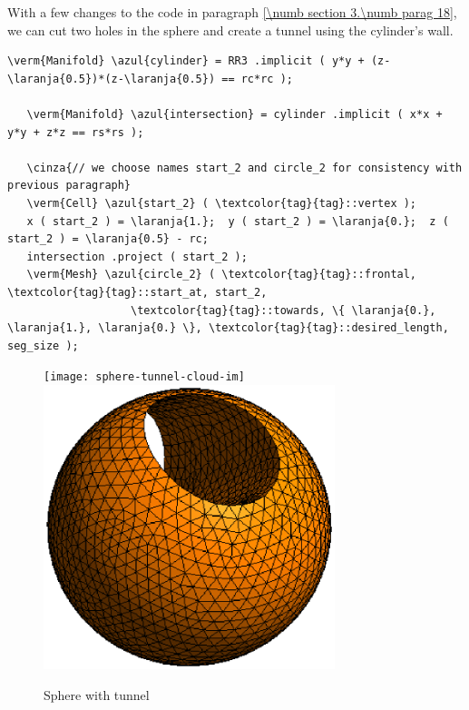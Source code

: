 With a few changes to the code in paragraph \ref{\numb section 3.\numb parag 18},
we can cut two holes in the sphere and create a tunnel using the cylinder's wall.
\medskip

\begin{Verbatim}[commandchars=\\\{\},formatcom=\small\tt,frame=single,
   label=parag-\ref{\numb section 3.\numb parag 19}.cpp,rulecolor=\color{moldura},
   baselinestretch=0.94,framesep=2mm                                              ]
   \verm{Manifold} \azul{cylinder} = RR3 .implicit ( y*y + (z-\laranja{0.5})*(z-\laranja{0.5}) == rc*rc );

   \verm{Manifold} \azul{intersection} = cylinder .implicit ( x*x + y*y + z*z == rs*rs );

   \cinza{// we choose names start_2 and circle_2 for consistency with previous paragraph}
   \verm{Cell} \azul{start_2} ( \textcolor{tag}{tag}::vertex );
   x ( start_2 ) = \laranja{1.};  y ( start_2 ) = \laranja{0.};  z ( start_2 ) = \laranja{0.5} - rc;
   intersection .project ( start_2 );
   \verm{Mesh} \azul{circle_2} ( \textcolor{tag}{tag}::frontal, \textcolor{tag}{tag}::start_at, start_2,
                   \textcolor{tag}{tag}::towards, \{ \laranja{0.}, \laranja{1.}, \laranja{0.} \}, \textcolor{tag}{tag}::desired_length, seg_size );
\end{Verbatim}

\begin{figure}[ht] \centering
\if{}
 \texttt{[image: sphere-tunnel-cloud-im]}
\else
 \includegraphics[width=85mm]{sphere-tunnel-low-res}
\fi
  \caption{Sphere with tunnel}
  \label{\numb section 3.\numb fig 7}
\end{figure}

